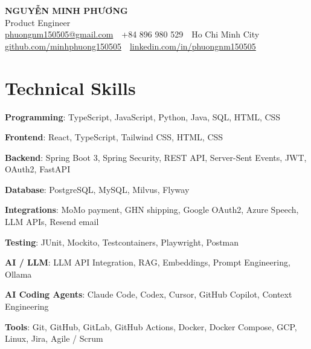 \documentclass[10pt, a4paper]{article}
\newcommand{\skillrow}[2]{\textbf{#1}: #2\par}
\begin{document}
\color{BodyText}

\begin{center}
  {\fontsize{21pt}{25pt}\selectfont\bfseries\color{NavyBlue} NGUYỄN MINH PHƯƠNG}\\[3pt]
  {\fontsize{12.5pt}{15pt}\selectfont\color{MutedText} Product Engineer}\\[4pt]
  {\footnotesize
  \href{mailto:phuongnm150505@gmail.com}{phuongnm150505@gmail.com}
  \,\textbar\, +84 896 980 529
  \,\textbar\, Ho Chi Minh City
  \,\textbar\, \href{https://github.com/minhphuong150505}{github.com/minhphuong150505}
  \,\textbar\, \href{https://www.linkedin.com/in/phuongnm150505/}{linkedin.com/in/phuongnm150505}}
\end{center}
\vspace{-6pt}

\section{Technical Skills}
\skillrow{Programming}{TypeScript, JavaScript, Python, Java, SQL, HTML, CSS}
\skillrow{Frontend}{React, TypeScript, Tailwind CSS, HTML, CSS}
\skillrow{Backend}{Spring Boot 3, Spring Security, REST API, Server-Sent Events, JWT, OAuth2, FastAPI}
\skillrow{Database}{PostgreSQL, MySQL, Milvus, Flyway}
\skillrow{Integrations}{MoMo payment, GHN shipping, Google OAuth2, Azure Speech, LLM APIs, Resend email}
\skillrow{Testing}{JUnit, Mockito, Testcontainers, Playwright, Postman}
\skillrow{AI / LLM}{LLM API Integration, RAG, Embeddings, Prompt Engineering, Ollama}
\skillrow{AI Coding Agents}{Claude Code, Codex, Cursor, GitHub Copilot, Context Engineering}
\skillrow{Tools}{Git, GitHub, GitLab, GitHub Actions, Docker, Docker Compose, GCP, Linux, Jira, Agile / Scrum}

\end{document}
